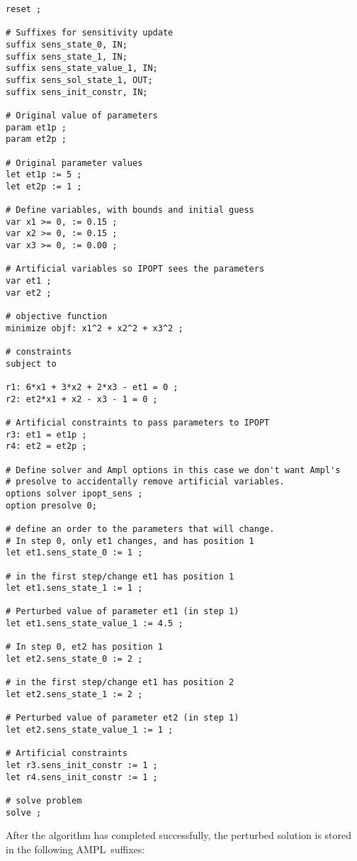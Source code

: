 \documentclass[letter, 11pt]{article}
\newcommand{\AMPL}{AMPL}
\begin{document}
\begin{lstlisting}[language=ampl, caption={\AMPL\ code for sensitivity update of Problem \ref{eq:exr}.}, label={ampl:ex2}, frame=single, captionpos=b]
reset ;

# Suffixes for sensitivity update
suffix sens_state_0, IN;
suffix sens_state_1, IN;
suffix sens_state_value_1, IN;
suffix sens_sol_state_1, OUT;
suffix sens_init_constr, IN;

# Original value of parameters
param et1p ;
param et2p ;

# Original parameter values
let et1p := 5 ;
let et2p := 1 ;

# Define variables, with bounds and initial guess
var x1 >= 0, := 0.15 ;
var x2 >= 0, := 0.15 ;
var x3 >= 0, := 0.00 ;

# Artificial variables so IPOPT sees the parameters
var et1 ;
var et2 ;

# objective function
minimize objf: x1^2 + x2^2 + x3^2 ;

# constraints
subject to

r1: 6*x1 + 3*x2 + 2*x3 - et1 = 0 ;
r2: et2*x1 + x2 - x3 - 1 = 0 ;

# Artificial constraints to pass parameters to IPOPT
r3: et1 = et1p ;
r4: et2 = et2p ;

# Define solver and Ampl options in this case we don't want Ampl's
# presolve to accidentally remove artificial variables.
options solver ipopt_sens ;
option presolve 0;

# define an order to the parameters that will change.
# In step 0, only et1 changes, and has position 1
let et1.sens_state_0 := 1 ;

# in the first step/change et1 has position 1
let et1.sens_state_1 := 1 ;

# Perturbed value of parameter et1 (in step 1)
let et1.sens_state_value_1 := 4.5 ;

# In step 0, et2 has position 1
let et2.sens_state_0 := 2 ;

# in the first step/change et1 has position 2
let et2.sens_state_1 := 2 ;

# Perturbed value of parameter et2 (in step 1)
let et2.sens_state_value_1 := 1 ;

# Artificial constraints
let r3.sens_init_constr := 1 ;
let r4.sens_init_constr := 1 ;

# solve problem
solve ;
\end{lstlisting}



After the algorithm has completed successfully, the perturbed solution is stored in the following \AMPL\ suffixes:
\end{document}
